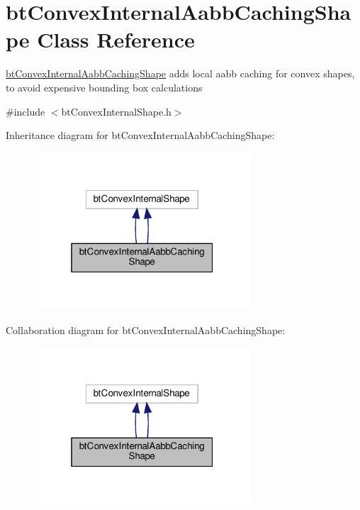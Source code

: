 \hypertarget{classbtConvexInternalAabbCachingShape}{}\section{bt\+Convex\+Internal\+Aabb\+Caching\+Shape Class Reference}
\label{classbtConvexInternalAabbCachingShape}


\hyperlink{classbtConvexInternalAabbCachingShape}{bt\+Convex\+Internal\+Aabb\+Caching\+Shape} adds local aabb caching for convex shapes, to avoid expensive bounding box calculations  




{\ttfamily \#include $<$bt\+Convex\+Internal\+Shape.\+h$>$}



Inheritance diagram for bt\+Convex\+Internal\+Aabb\+Caching\+Shape\+:
\nopagebreak
\begin{figure}[H]
\begin{center}
\leavevmode
\includegraphics[width=229pt]{classbtConvexInternalAabbCachingShape__inherit__graph}
\end{center}
\end{figure}


Collaboration diagram for bt\+Convex\+Internal\+Aabb\+Caching\+Shape\+:
\nopagebreak
\begin{figure}[H]
\begin{center}
\leavevmode
\includegraphics[width=229pt]{classbtConvexInternalAabbCachingShape__coll__graph}
\end{center}
\end{figure}
